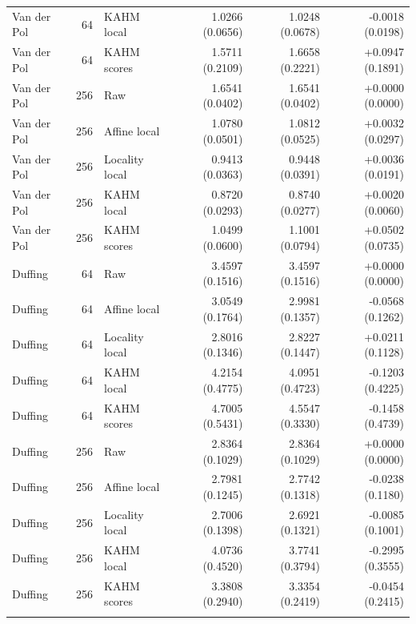 \begin{longtable}{lrlrrr}
Van der Pol & 64 & KAHM local & 1.0266 (0.0656) & 1.0248 (0.0678) & -0.0018 (0.0198) \\
Van der Pol & 64 & KAHM scores & 1.5711 (0.2109) & 1.6658 (0.2221) & +0.0947 (0.1891) \\
\addlinespace
Van der Pol & 256 & Raw & 1.6541 (0.0402) & 1.6541 (0.0402) & +0.0000 (0.0000) \\
Van der Pol & 256 & Affine local & 1.0780 (0.0501) & 1.0812 (0.0525) & +0.0032 (0.0297) \\
Van der Pol & 256 & Locality local & 0.9413 (0.0363) & 0.9448 (0.0391) & +0.0036 (0.0191) \\
Van der Pol & 256 & KAHM local & 0.8720 (0.0293) & 0.8740 (0.0277) & +0.0020 (0.0060) \\
Van der Pol & 256 & KAHM scores & 1.0499 (0.0600) & 1.1001 (0.0794) & +0.0502 (0.0735) \\
\addlinespace
Duffing & 64 & Raw & 3.4597 (0.1516) & 3.4597 (0.1516) & +0.0000 (0.0000) \\
Duffing & 64 & Affine local & 3.0549 (0.1764) & 2.9981 (0.1357) & -0.0568 (0.1262) \\
Duffing & 64 & Locality local & 2.8016 (0.1346) & 2.8227 (0.1447) & +0.0211 (0.1128) \\
Duffing & 64 & KAHM local & 4.2154 (0.4775) & 4.0951 (0.4723) & -0.1203 (0.4225) \\
Duffing & 64 & KAHM scores & 4.7005 (0.5431) & 4.5547 (0.3330) & -0.1458 (0.4739) \\
\addlinespace
Duffing & 256 & Raw & 2.8364 (0.1029) & 2.8364 (0.1029) & +0.0000 (0.0000) \\
Duffing & 256 & Affine local & 2.7981 (0.1245) & 2.7742 (0.1318) & -0.0238 (0.1180) \\
Duffing & 256 & Locality local & 2.7006 (0.1398) & 2.6921 (0.1321) & -0.0085 (0.1001) \\
Duffing & 256 & KAHM local & 4.0736 (0.4520) & 3.7741 (0.3794) & -0.2995 (0.3555) \\
Duffing & 256 & KAHM scores & 3.3808 (0.2940) & 3.3354 (0.2419) & -0.0454 (0.2415) \\
\addlinespace
\end{longtable}
\endgroup
